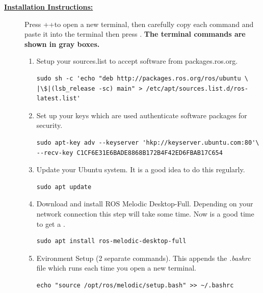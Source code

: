 \documentclass[12pt]{article}
\newcommand{\T}{\raisebox{-0.1em}{T}}
\newcommand{\TKey}{\keystroke{\T}}
\newcommand{\CTRL}{\raisebox{-0.1em}{Ctrl}}
\newcommand{\CTRLKey}{\keystroke{\CTRL}}
\newcommand{\ALT}{\raisebox{-0.1em}{Alt}}
\newcommand{\ALTKey}{\keystroke{\ALT}}
\newcommand{\ENTER}{\raisebox{-0.1em}{Enter}}
\newcommand{\ENTERKey}{\keystroke{\ENTER}}
\begin{document}
\begin{description}
\item[\textbf{\underline{Installation Instructions:}}] \hfill \vspace{0mm}

Press \CTRLKey+\ALTKey+\TKey to open a new terminal, then carefully copy each command and paste it into the terminal then press \ENTERKey. { \bf The terminal commands are shown in gray boxes.}


\begin{enumerate}
	
	
	\item  Setup your sources.list to accept software from packages.ros.org.

	\begin{verbatim}
sudo sh -c 'echo "deb http://packages.ros.org/ros/ubuntu \
|\$|(lsb_release -sc) main" > /etc/apt/sources.list.d/ros-latest.list'
	\end{verbatim}
	
	\item Set up your keys which are used authenticate software packages for security.
	
	\begin{verbatim}
sudo apt-key adv --keyserver 'hkp://keyserver.ubuntu.com:80'\
--recv-key C1CF6E31E6BADE8868B172B4F42ED6FBAB17C654	
	\end{verbatim}
				
	\item Update your Ubuntu system. It is a good idea to do this regularly.  
	
	\begin{verbatim}
sudo apt update
	\end{verbatim}

\newpage
	
	\item Download and install ROS Melodic Desktop-Full. Depending on your network connection this step will take some time. Now is a good time to get a \Coffeecup \Cooley.  
	
	\begin{verbatim}
sudo apt install ros-melodic-desktop-full
	\end{verbatim}

\item Evironment Setup (2 separate commands). This appends the {\it .bashrc} file which runs each time you open a new terminal. 
\begin{verbatim} 
echo "source /opt/ros/melodic/setup.bash" >> ~/.bashrc
\end{verbatim}


\end{enumerate}
\end{description}
\end{document}
